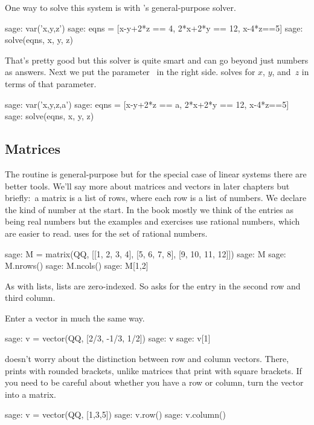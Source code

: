 One way to solve this system is with \Sage's general-purpose solver.
\begin{sagecommandline}
sage: var('x,y,z')                                  
sage: eqns = [x-y+2*z == 4, 2*x+2*y == 12, x-4*z==5]
sage: solve(eqns, x, y, z)                            
\end{sagecommandline}
That's pretty good but this solver is quite smart and can go beyond just numbers
as answers.
Next we put the parameter~ in the right side. 
\Sage{}
solves for $x$, $y$, and~$z$ in terms of that parameter.
\begin{sagecommandline}
sage: var('x,y,z,a')                                
sage: eqns = [x-y+2*z == a, 2*x+2*y == 12, x-4*z==5]
sage: solve(eqns, x, y, z) 
\end{sagecommandline}



\subsection{Matrices}
The  routine is general-purpose but 
for the special case of linear systems there are better tools.
We'll say more about matrices and vectors in later chapters but 
briefly:~a \Sage{} matrix is a list of rows, where
each row is a list of numbers. 
We declare the kind of number at the start.
In the book mostly we think of the entries as being real numbers
but the examples and exercises use rational numbers, which are
easier to read.
\Sage{} uses  for the set of rational numbers.
\begin{sagecommandline}
sage: M = matrix(QQ, [[1, 2, 3, 4], [5, 6, 7, 8], [9, 10, 11, 12]])
sage: M
sage: M.nrows()
sage: M.ncols()
sage: M[1,2]
\end{sagecommandline}
As with \python{} lists, \Sage{} lists are zero-indexed.  
So  asks
for the entry in the second row and third column. 

Enter a vector in much the same way.
\begin{sagecommandline}
sage: v = vector(QQ, [2/3, -1/3, 1/2])
sage: v
sage: v[1]
\end{sagecommandline}
\Sage{} doesn't worry about the distinction between row and column
vectors.
There,  prints with rounded brackets, unlike matrices
that print with square brackets.
If you need to be careful about whether you have a row or column, turn the 
vector into a matrix.
\begin{sagecommandline}
sage: v = vector(QQ, [1,3,5])
sage: v.row()
sage: v.column()
\end{sagecommandline}

